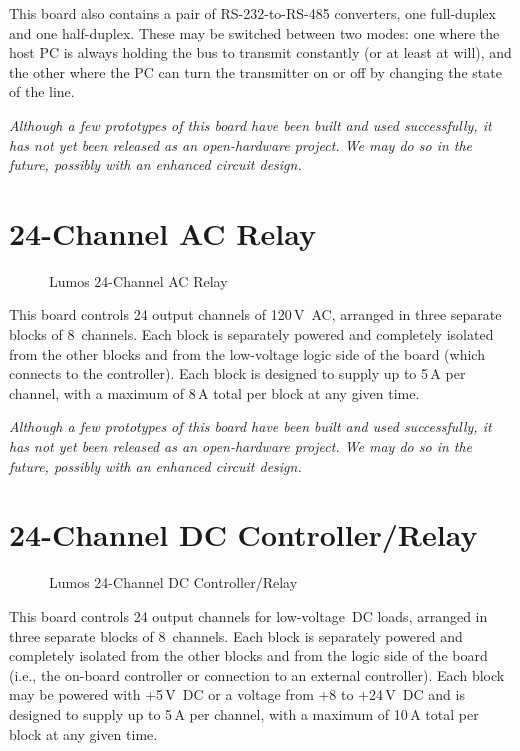 \documentclass[letterpaper,twoside,onecolumn,openright,final]{memoir}
\begin{document}
This board also contains a pair of RS-232-to-RS-485 converters, one full-duplex and one half-duplex.
These may be switched between two modes: one where the host PC is always holding the bus to transmit
constantly (or at least at will), and the other where the PC can turn the transmitter on or off by
changing the state of the  line.

\emph{Although a few prototypes of this board have been built and used successfully, it has not yet been
released as an open-hardware project.  We may do so in the future, possibly with an enhanced circuit
design.}

\section{24-Channel AC Relay}
\begin{figure}
  \begin{center}
  \end{center}
  \caption{Lumos 24-Channel AC Relay}
\end{figure}
This board controls 24 output channels of 120\,V~AC, arranged in three separate blocks of 8~channels.
Each block is separately powered and completely isolated from the other blocks and from the low-voltage
logic side of the board (which connects to the controller).  Each block is designed to supply up to
5\,A per channel, with a maximum of 8\,A total per block at any given time.

\emph{Although a few prototypes of this board have been built and used successfully, it has not yet been
released as an open-hardware project.  We may do so in the future, possibly with an enhanced circuit
design.}
\section{24-Channel DC Controller/Relay}
\begin{figure}
  \begin{center}
  \end{center}
  \caption{Lumos 24-Channel DC Controller/Relay}
\end{figure}
This board controls 24 output channels for low-voltage~DC loads, arranged in three separate blocks 
of 8~channels.  Each block is separately powered and completely isolated from the other blocks and 
from the logic side of the board (i.e., the on-board controller or connection to an external
controller).  Each block may be powered with +5\,V~DC or a voltage from +8 to +24\,V~DC and
is designed to supply up to 5\,A per channel, with a maximum of 10\,A total per block at any 
given time.
\end{document}
